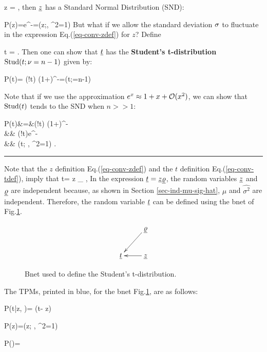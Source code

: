 \beq
z =
\label{eq-conv-zdef}
\;,
\eeq
then ${\underline{z}}$ has a Standard Normal
 Distribution (SND):

\beq
P(z)=e^{-}=\caln(z;, \s^2=1)
\eeq
But what if we allow the standard deviation $\sigma$
to fluctuate in the expression
Eq.(\ref{eq-conv-zdef}) for $z$?
Define

\beq
t =
\;.
\label{eq-conv-tdef}
\eeq
Then one can show that 
${\underline{t}}$
has the {\bf Student's t-distribution}
${\rm Stud}(t;\nu=n-1)$
given by:

\beq
P(t)=
\caln(!t)
(1+)^{-}=(t;\nu=n-1)
\eeq

Note that if we use the approximation
$e^x\approx 1 +x +{\cal O}(x^2)$,
we can show that ${\rm Stud}(t)$
tends to the SND
when $n>>1$:

\beqa
P(t)&=&\caln(!t)
(1+)^{-}
\\
&\approx&
\caln(!t)e^{-}
\\
&\approx&
\caln(t; , \s^2=1)
\;.
\eeqa

\hrule{}

Note that the $z$ definition
Eq.(\ref{eq-conv-zdef})
and the $t$ definition
Eq.(\ref{eq-conv-tdef}),
imply that
\beq
t= z 
_{\varrho}
\;,
\eeq
In the
expression ${\underline{t}}={\underline{z}}\underline{\varrho}$,
the 
 random variables 
${\underline{z}}$ and $\underline{\varrho}$
are independent
because, as shown in Section
\ref{sec-ind-mu-sig-hat},  
 $\hat{\mu}$
and $\hat{\sigma^2}$
are independent.
Therefore, the random variable ${\underline{t}}$
can be defined using the bnet
of Fig.\ref{fig-stud-bnet}.

\begin{figure}[h!]
$$
\xymatrix{
&\ul{\varrho}\ar[ld]
\\
\rvt&\rvz\ar[l]
}
$$
\caption{Bnet used to define
the Student's t-distribution.}
\label{fig-stud-bnet}
\end{figure}
The TPMs, printed in blue,
for the bnet Fig.\ref{fig-stud-bnet},
are as follows:

\beq\color{blue}
P(t|z, \varrho)=
\delta(t- z\varrho)
\;\;\;
\eeq

\beq\color{blue}
P(z)=\caln(z; , \s^2=1)
\eeq

\beq\color{blue}
P(\varrho)=
\eeq

